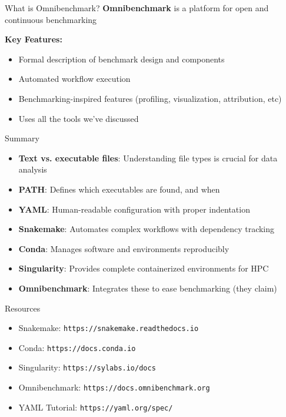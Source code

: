 \documentclass[aspectratio=169]{beamer}
\begin{document}

\begin{frame}{What is Omnibenchmark?}
    \textbf{Omnibenchmark} is a platform for open and continuous benchmarking
    
    \vspace{0.5cm}
    \textbf{Key Features:}
    \begin{itemize}
        \item Formal description of benchmark design and components
        \item Automated workflow execution
        \item Benchmarking-inspired features (profiling, visualization, attribution, etc)
        \item Uses all the tools we've discussed
    \end{itemize}
  \end{frame}
  
\begin{frame}{Summary}
    \begin{itemize}
        \item \textbf{Text vs. executable files}: Understanding file types is crucial for data analysis
        \item \textbf{PATH}: Defines which executables are found, and when
        \item \textbf{YAML}: Human-readable configuration with proper indentation
        \item \textbf{Snakemake}: Automates complex workflows with dependency tracking
        \item \textbf{Conda}: Manages software and environments reproducibly
        \item \textbf{Singularity}: Provides complete containerized environments for HPC
        \item \textbf{Omnibenchmark}: Integrates these to ease benchmarking (they claim)
    \end{itemize}
    
\end{frame}

\begin{frame}{Resources}
    \begin{itemize}
        \item Snakemake: \texttt{https://snakemake.readthedocs.io}
        \item Conda: \texttt{https://docs.conda.io}
        \item Singularity: \texttt{https://sylabs.io/docs}
        \item Omnibenchmark: \texttt{https://docs.omnibenchmark.org}
        \item YAML Tutorial: \texttt{https://yaml.org/spec/}
    \end{itemize}
\end{frame}
\end{document}
